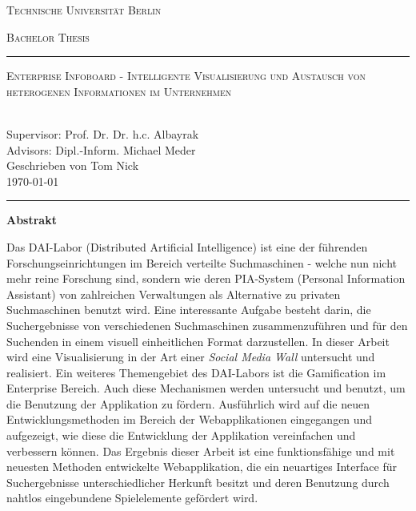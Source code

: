 \documentclass[12pt,twoside]{book}
\renewcommand{\title}{Enterprise Infoboard - Intelligente Visualisierung und Austausch von heterogenen Informationen im Unternehmen}
\renewcommand{\author}{Tom Nick}
\begin{document}
\begin{titlepage}
\begin{center}
{\Huge \textsc{Technische Universität Berlin}}
{\fontsize{2.5cm}{2cm}\selectfont \textsc{Bachelor Thesis}\par}
\vspace{1cm}
\hrule
\vspace{0.3cm}
{\Huge \textsc{\title{}}\par}
~\\[0.1cm]
{\Large Supervisor: Prof. Dr. Dr. h.c. Albayrak}\\[0.1cm]
{\Large Advisors: Dipl.-Inform. Michael Meder}\\[0.3cm]
{\Large Geschrieben von \author{}}\\[0.1cm]
{\Large \today}
\vspace{0.55cm}
\hrule
\end{center}
\vfill
\begin{center}{\Large\textbf{Abstrakt}}\end{center}

Das DAI-Labor (Distributed Artificial Intelligence) ist eine der führenden Forschungseinrichtungen im Bereich verteilte Suchmaschinen - welche nun nicht mehr reine Forschung sind, sondern wie deren PIA-System (Personal Information Assistant) von zahlreichen Verwaltungen als Alternative zu privaten Suchmaschinen benutzt wird. Eine interessante Aufgabe besteht darin, die Suchergebnisse von verschiedenen Suchmaschinen zusammenzuführen und für den Suchenden in einem visuell einheitlichen Format darzustellen. In dieser Arbeit wird eine Visualisierung in der Art einer \textit{Social Media Wall} untersucht und realisiert.
Ein weiteres Themengebiet des DAI-Labors ist die Gamification im Enterprise Bereich. Auch diese Mechanismen werden untersucht und benutzt, um die Benutzung der Applikation zu fördern.
Ausführlich wird auf die neuen Entwicklungsmethoden im Bereich der Webapplikationen eingegangen und aufgezeigt, wie diese die Entwicklung der Applikation vereinfachen und verbessern können.
Das Ergebnis dieser Arbeit ist eine funktionsfähige und mit neuesten Methoden entwickelte Webapplikation, die ein neuartiges Interface für Suchergebnisse unterschiedlicher Herkunft besitzt und deren Benutzung durch nahtlos eingebundene Spielelemente gefördert wird.

\end{titlepage}
\end{document}
